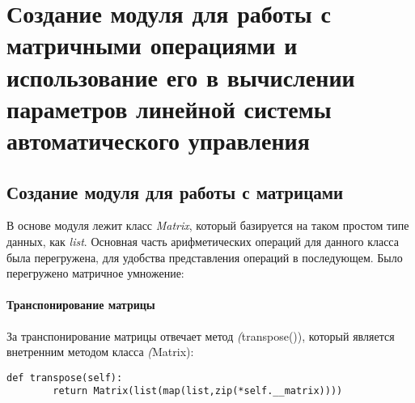 \newpage
\section*{Создание модуля для работы с матричными операциями и использование его в вычислении параметров линейной системы автоматического управления}

\subsection*{Создание модуля для работы с матрицами\\}

В основе модуля лежит класс \textit{Matrix}, который базируется на таком простом типе данных, как \textit{list}. Основная часть арифметических операций для данного класса была перегружена, для удобства представления операций в последующем. Было перегружено матричное умножение:

\paragraph{Транспонирование матрицы\\}

За транспонирование матрицы отвечает метод \textit(transpose()), который является внетренним методом класса \textit(Matrix):

\begin{lstlisting}
def transpose(self):
		return Matrix(list(map(list,zip(*self.__matrix))))
\end{lstlisting}
